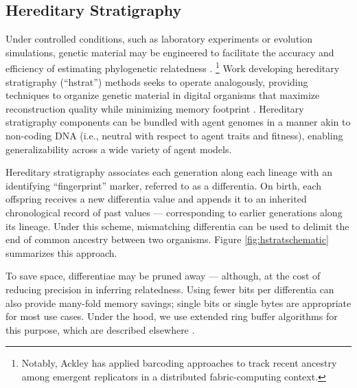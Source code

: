 \subsection{Hereditary Stratigraphy}




Under controlled conditions, such as laboratory experiments or evolution simulations, genetic material may be engineered to facilitate the accuracy and efficiency of estimating phylogenetic relatedness \citep{li2024reconstructing,ackley2023robust}.%
\unskip\footnote{Notably, Ackley has applied barcoding approaches to track recent ancestry among emergent replicators in a distributed fabric-computing context.}
Work developing hereditary stratigraphy (``hstrat'') methods seeks to operate analogously, providing techniques to organize genetic material in digital organisms that maximize reconstruction quality while minimizing memory footprint \citep{moreno2022hereditary}.
Hereditary stratigraphy components can be bundled with agent genomes in a manner akin to non-coding DNA (i.e., neutral with respect to agent traits and fitness), enabling generalizability across a wide variety of agent models.

Hereditary stratigraphy associates each generation along each lineage with an identifying ``fingerprint'' marker, referred to as a differentia.
On birth, each offspring receives a new differentia value and appends it to an inherited chronological record of past values --- corresponding to earlier generations along its lineage.
Under this scheme, mismatching differentia can be used to delimit the end of common ancestry between two organisms.
Figure \ref{fig:hstratschematic} summarizes this approach.

To save space, differentiae may be pruned away --- although, at the cost of reducing precision in inferring relatedness.
Using fewer bits per differentia can also provide many-fold memory savings; single bits or single bytes are appropriate for most use cases.
Under the hood, we use extended ring buffer algorithms for this purpose, which are described elsewhere \citep{TODO,TODOcompressing}.

